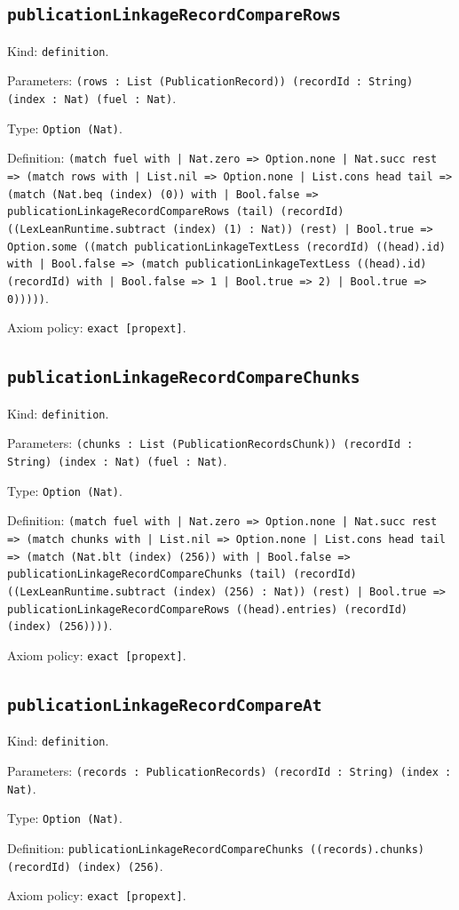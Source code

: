 \documentclass[11pt]{article}
\begin{document}
\subsection*{\texttt{publicationLinkageRecordCompareRows}}
\noindent Kind: \texttt{definition}.\par
\noindent Parameters: \texttt{(rows : List (PublicationRecord)) (recordId : String) (index : Nat) (fuel : Nat)}.\par
\noindent Type: \texttt{Option (Nat)}.\par
\noindent Definition: \texttt{(match fuel with | Nat.zero => Option.none | Nat.succ rest => (match rows with | List.nil => Option.none | List.cons head tail => (match (Nat.beq (index) (0)) with | Bool.false => publicationLinkageRecordCompareRows (tail) (recordId) ((LexLeanRuntime.subtract (index) (1) : Nat)) (rest) | Bool.true => Option.some ((match publicationLinkageTextLess (recordId) ((head).id) with | Bool.false => (match publicationLinkageTextLess ((head).id) (recordId) with | Bool.false => 1 | Bool.true => 2) | Bool.true => 0)))))}.\par
\noindent Axiom policy: \texttt{exact [propext]}.\par
\subsection*{\texttt{publicationLinkageRecordCompareChunks}}
\noindent Kind: \texttt{definition}.\par
\noindent Parameters: \texttt{(chunks : List (PublicationRecordsChunk)) (recordId : String) (index : Nat) (fuel : Nat)}.\par
\noindent Type: \texttt{Option (Nat)}.\par
\noindent Definition: \texttt{(match fuel with | Nat.zero => Option.none | Nat.succ rest => (match chunks with | List.nil => Option.none | List.cons head tail => (match (Nat.blt (index) (256)) with | Bool.false => publicationLinkageRecordCompareChunks (tail) (recordId) ((LexLeanRuntime.subtract (index) (256) : Nat)) (rest) | Bool.true => publicationLinkageRecordCompareRows ((head).entries) (recordId) (index) (256))))}.\par
\noindent Axiom policy: \texttt{exact [propext]}.\par
\subsection*{\texttt{publicationLinkageRecordCompareAt}}
\noindent Kind: \texttt{definition}.\par
\noindent Parameters: \texttt{(records : PublicationRecords) (recordId : String) (index : Nat)}.\par
\noindent Type: \texttt{Option (Nat)}.\par
\noindent Definition: \texttt{publicationLinkageRecordCompareChunks ((records).chunks) (recordId) (index) (256)}.\par
\noindent Axiom policy: \texttt{exact [propext]}.\par
\end{document}
